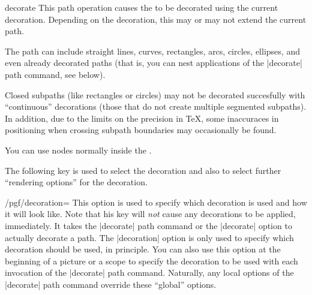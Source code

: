 \begin{pathoperation}{decorate}{}
  This path operation causes the  to be
  decorated using the current decoration. Depending on the decoration,
  this may or may not extend the current path.
\begin{codeexample}[]
\end{codeexample}
  The path can include straight lines, curves,
  rectangles, arcs, circles, ellipses, and even already decorated
  paths (that is, you can nest applications of the |decorate| path
  command, see below).

  Closed subpaths (like  rectangles or circles) may not be decorated
  succesfully with ``continuous'' decorations (those that do not
  create multiple segmented subpaths). In addition, due to the limits
  on the precision in  \TeX, some inaccuraces in positioning when
  crossing subpath boundaries may occasionally be found.

  You can use nodes normally inside the .
\begin{codeexample}[]
\end{codeexample}
  
  The following key is used to select the decoration and also to
  select further ``rendering options'' for the decoration.

  \begin{key}{/pgf/decoration=}
    This option is used to specify which decoration is used and how it
    will look like. Note that his key will \emph{not} cause any
    decorations to be applied, immediately. It takes the |decorate| path
    command or the |decorate| option to actually decorate a path. The
    |decoration| option is only used to specify which decoration should
    be used, in principle. You can also use this option at the
    beginning of a picture or a scope to specify the decoration to be
    used with each invocation of the |decorate| path
    command. Naturally, any local options of the |decorate| path
    command override these ``global'' options.
\begin{codeexample}[]
\end{codeexample}
    

\end{key}
\end{pathoperation}
